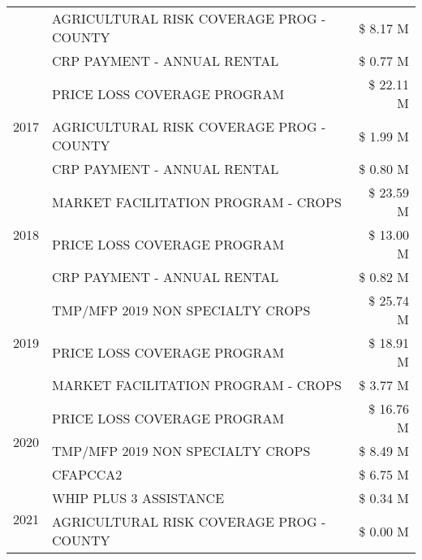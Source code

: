 \begin{tabular}{llr}
 & AGRICULTURAL RISK COVERAGE PROG - COUNTY & \$ 8.17 M \\
 & CRP PAYMENT - ANNUAL RENTAL & \$ 0.77 M \\
\cline{1-3}
\multirow[t]{3}{*}{2017} & PRICE LOSS COVERAGE PROGRAM & \$ 22.11 M \\
 & AGRICULTURAL RISK COVERAGE PROG - COUNTY & \$ 1.99 M \\
 & CRP PAYMENT - ANNUAL RENTAL & \$ 0.80 M \\
\cline{1-3}
\multirow[t]{3}{*}{2018} & MARKET FACILITATION PROGRAM - CROPS & \$ 23.59 M \\
 & PRICE LOSS COVERAGE PROGRAM & \$ 13.00 M \\
 & CRP PAYMENT - ANNUAL RENTAL & \$ 0.82 M \\
\cline{1-3}
\multirow[t]{3}{*}{2019} & TMP/MFP 2019 NON SPECIALTY CROPS & \$ 25.74 M \\
 & PRICE LOSS COVERAGE PROGRAM & \$ 18.91 M \\
 & MARKET FACILITATION PROGRAM - CROPS & \$ 3.77 M \\
\cline{1-3}
\multirow[t]{3}{*}{2020} & PRICE LOSS COVERAGE PROGRAM & \$ 16.76 M \\
 & TMP/MFP 2019 NON SPECIALTY CROPS & \$ 8.49 M \\
 & CFAPCCA2 & \$ 6.75 M \\
\cline{1-3}
\multirow[t]{2}{*}{2021} & WHIP PLUS 3 ASSISTANCE & \$ 0.34 M \\
 & AGRICULTURAL RISK COVERAGE PROG - COUNTY & \$ 0.00 M \\
\cline{1-3}
\bottomrule
\end{tabular}
